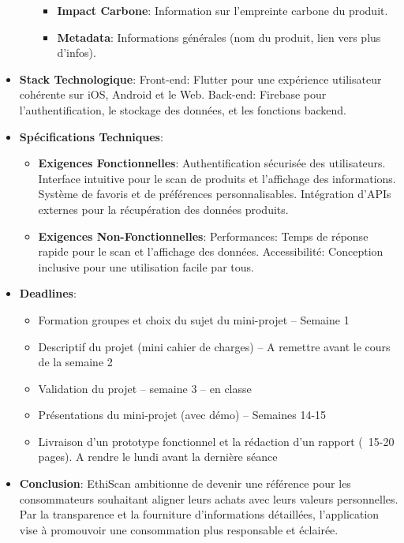 \begin{itemize}
\begin{itemize}
\begin{itemize}
                        \item \textbf{Impact Carbone}: Information sur l'empreinte carbone du produit.
                        \item \textbf{Metadata}: Informations générales (nom du produit, lien vers plus d'infos).
                    \end{itemize}
          \end{itemize}
    \item \textbf{Stack Technologique}: Front-end: Flutter pour une expérience utilisateur cohérente sur iOS, Android et le Web. Back-end: Firebase pour l'authentification, le stockage des données, et les fonctions backend.
    \item \textbf{Spécifications Techniques}:
          \begin{itemize}
              \item \textbf{Exigences Fonctionnelles}: Authentification sécurisée des utilisateurs. Interface intuitive pour le scan de produits et l'affichage des informations. Système de favoris et de préférences personnalisables. Intégration d'APIs externes pour la récupération des données produits.
              \item \textbf{Exigences Non-Fonctionnelles}: Performances: Temps de réponse rapide pour le scan et l'affichage des données. Accessibilité: Conception inclusive pour une utilisation facile par tous.
          \end{itemize}
    \item \textbf{Deadlines}:
          \begin{itemize}
              \item Formation groupes et choix du sujet du mini-projet – Semaine 1
              \item Descriptif du projet (mini cahier de charges) – A remettre avant le cours de la semaine 2
              \item Validation du projet – semaine 3 – en classe
              \item Présentations du mini-projet (avec démo) – Semaines 14-15
              \item Livraison d’un prototype fonctionnel et la rédaction d’un rapport (~15-20 pages). A rendre le lundi avant la dernière séance
          \end{itemize}
    \item \textbf{Conclusion}: EthiScan ambitionne de devenir une référence pour les consommateurs souhaitant aligner leurs achats avec leurs valeurs personnelles. Par la transparence et la fourniture d'informations détaillées, l'application vise à promouvoir une consommation plus responsable et éclairée.
\end{itemize}

